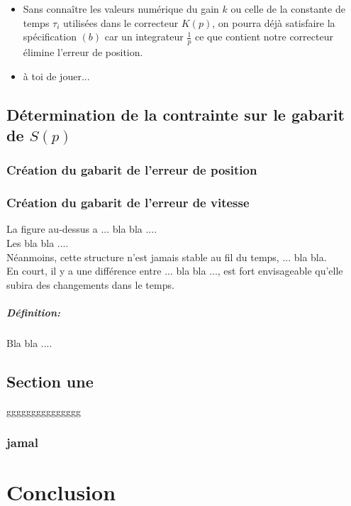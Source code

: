 \documentclass[12pt, a4paper, openany]{report}
\begin{document}
  \begin{itemize} [label=,font=\small \color{black}]
  	\item Sans connaître les valeurs numérique du gain $k$ ou celle de la constante de temps $\tau_{i}$ utilisées dans le correcteur $K(p)$, on pourra déjà satisfaire la spécification $(b)$ car un integrateur $\frac{1}{p}$ ce que contient notre correcteur élimine l'erreur de position.
    \item à toi de jouer...
  \end{itemize}
 
 \section{Détermination de la contrainte sur le gabarit de $S(p)$}  
 
  \subsection{Création du gabarit de l'erreur de position}
  
  
  
  \subsection{Création du gabarit de l'erreur de vitesse}
  
 La figure au-dessus a ... bla bla ....\\
 
 Les bla bla ....\\
 
 Néanmoins, cette structure n’est jamais stable au fil du temps, ... bla bla.\\
  
 En court, il y a une différence entre ... bla bla ..., est fort envisageable qu’elle subira des changements dans le temps.
 
 \paragraph{Définition:}
  Bla bla ....

 \section{Section une}
  ggggggggggggggg
  \subsection{jamal}

\chapter*{Conclusion}
 

  
\end{document}

